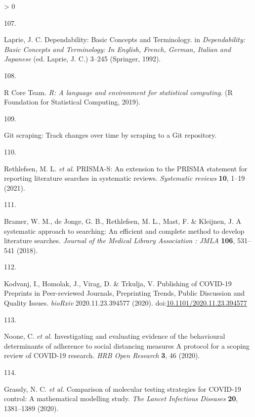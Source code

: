 \documentclass[a4paper, twoside]{templates/ociamthesis}
\newlength{\cslhangindent}
\newlength{\csllabelwidth}
\newenvironment{CSLReferences}[3] %
 {%
  \setlength{\parindent}{0pt}
  \ifodd #1 \everypar{\setlength{\hangindent}{\cslhangindent}}\ignorespaces\fi
  \ifnum #2 > 0
  \setlength{\parskip}{#2\baselineskip}
  \fi
 }%
 {}
\newcommand{\CSLLeftMargin}[1]{\parbox[t]{\maxof{\widthof{#1}}{\csllabelwidth}}{#1}}
\newcommand{\CSLRightInline}[1]{\parbox[t]{\linewidth - \csllabelwidth}{#1}}
\begin{document}
\begin{CSLReferences}{0}{0}
\leavevmode\hypertarget{ref-laprie1992}{}%
\CSLLeftMargin{107. }
\CSLRightInline{Laprie, J. C. Dependability: {Basic Concepts} and {Terminology}. in \emph{Dependability: {Basic Concepts} and {Terminology}: {In English}, {French}, {German}, {Italian} and {Japanese}} (ed. Laprie, J. C.) 3--245 ({Springer}, 1992).}

\leavevmode\hypertarget{ref-rcoreteam2019}{}%
\CSLLeftMargin{108. }
\CSLRightInline{R Core Team. \emph{R: {A} language and environment for statistical computing}. ({R Foundation for Statistical Computing}, 2019).}

\leavevmode\hypertarget{ref-zotero-15031}{}%
\CSLLeftMargin{109. }
\CSLRightInline{Git scraping: Track changes over time by scraping to a {Git} repository.}

\leavevmode\hypertarget{ref-rethlefsen2021prisma}{}%
\CSLLeftMargin{110. }
\CSLRightInline{Rethlefsen, M. L. \emph{et al.} {PRISMA}-{S}: An extension to the {PRISMA} statement for reporting literature searches in systematic reviews. \emph{Systematic reviews} \textbf{10}, 1--19 (2021).}

\leavevmode\hypertarget{ref-bramer2018}{}%
\CSLLeftMargin{111. }
\CSLRightInline{Bramer, W. M., de Jonge, G. B., Rethlefsen, M. L., Mast, F. \& Kleijnen, J. A systematic approach to searching: An efficient and complete method to develop literature searches. \emph{Journal of the Medical Library Association : JMLA} \textbf{106}, 531--541 (2018).}

\leavevmode\hypertarget{ref-kodvanj2020}{}%
\CSLLeftMargin{112. }
\CSLRightInline{Kodvanj, I., Homolak, J., Virag, D. \& Trkulja, V. Publishing of {COVID}-19 {Preprints} in {Peer}-reviewed {Journals}, {Preprinting Trends}, {Public Discussion} and {Quality Issues}. \emph{bioRxiv} 2020.11.23.394577 (2020). doi:\href{https://doi.org/10.1101/2020.11.23.394577}{10.1101/2020.11.23.394577}}

\leavevmode\hypertarget{ref-noone2020}{}%
\CSLLeftMargin{113. }
\CSLRightInline{Noone, C. \emph{et al.} Investigating and evaluating evidence of the behavioural determinants of adherence to social distancing measures {} {A} protocol for a scoping review of {COVID}-19 research. \emph{HRB Open Research} \textbf{3}, 46 (2020).}

\leavevmode\hypertarget{ref-grassly2020}{}%
\CSLLeftMargin{114. }
\CSLRightInline{Grassly, N. C. \emph{et al.} Comparison of molecular testing strategies for {COVID}-19 control: A mathematical modelling study. \emph{The Lancet Infectious Diseases} \textbf{20}, 1381--1389 (2020).}


\end{CSLReferences}
\end{document}
